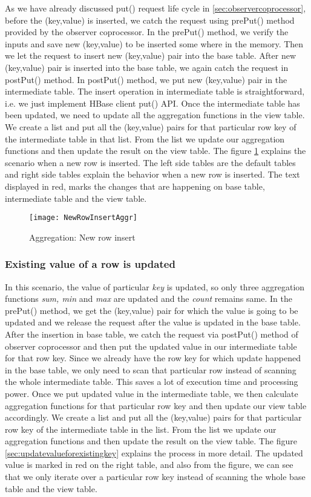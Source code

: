 \documentclass[11pt,a4paper,bibtotoc,idxtotoc,headsepline,footsepline,footexclude,BCOR12mm,DIV13]{scrbook}
\begin{document}
As we have already discussed put() request life cycle in \ref{sec:observercoprocessor}, before the (key,value) is inserted, we catch the request using prePut() method provided by the observer coprocessor. In the prePut() method, we verify the inputs and save new (key,value) to be inserted some where in the memory. Then we let the request to insert new (key,value) pair into the base table. After new (key,value) pair is inserted into the base table, we again catch the request in postPut() method. In postPut() method, we put new (key,value) pair in the intermediate table. The insert operation in intermediate table is straightforward, i.e. we just implement HBase client put() API. Once the intermediate table has been updated, we need to update all the aggregation functions in the view table. We create a list and put all the (key,value) pairs for that particular row key of the intermediate table in that list. From the list we update our aggregation functions and then update the result on the view table. The figure \ref{sec:newrowinsertagggregation} explains the scenario when a new row is inserted. The left side tables are the default tables and right side tables explain the behavior when a new row is inserted. The text displayed in red, marks the changes that are happening on base table, intermediate table and the view table. 
\begin{figure}
    \centering
    \texttt{[image: NewRowInsertAggr]}
    \caption{Aggregation: New row insert}
    \label{sec:newrowinsertagggregation}
    
\end{figure}

\newpage
\subsubsection{Existing value of a row is updated}
In this scenario, the value of particular \emph{key} is updated, so only three aggregation functions \emph{sum, min} and \emph{max} are updated and the \emph{count} remains same. In the prePut() method, we get the (key,value) pair for which the value is going to be updated and we release the request after the value is updated in the base table. After the insertion in base table, we catch the request via postPut() method of observer coprocessor and then put the updated value in our intermediate table for that row key. Since we already have the row key for which update happened in the base table, we only need to scan that particular row instead of scanning the whole intermediate table. This saves a lot of execution time and processing power. Once we put updated value in the intermediate table, we then calculate aggregation functions for that particular row key and then update our view table accordingly. We create a list and put all the (key,value) pairs for that particular row key of the intermediate table in the list. From the list we update our aggregation functions and then update the result on the view table. The figure \ref{sec:updatevalueforexistingkey} explains the process in more detail. The updated value is marked in red on the right table, and also from the figure, we can see that we only iterate over a particular row key instead of scanning the whole base table and the view table.
\end{document}
